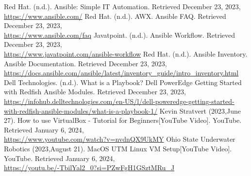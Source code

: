 \documentclass[semifinal]{cpecmu}
\author{นายชลนันต์ ทองไทย}{Chonlanan Thongthai}{640610625}
\author{นายทัตพงศ์ เสริมสุข}{Tadphong Sermsook}{640610636}
\author{นายศุภณัฐ วังทิพย์}{Suphanath Wangtip}{640612098}
\begin{document}


\pagestyle{empty}\cleardoublepage
\normalspacing \setcounter{page}{1}  \pagestyle{cpecmu}





\ifproject

\fi


\begin{thebibliography}{9}
  Red Hat. (n.d.). Ansible: Simple IT Automation. Retrieved December 23, 2023,\\ \url{https://www.ansible.com/}
  Red Hat. (n.d.). AWX. Ansible FAQ. Retrieved December 23, 2023,\\ \url{https://www.ansible.com/faq}
   Javatpoint. (n.d.). Ansible Workflow. Retrieved December 23, 2023, \\ \url{https://www.javatpoint.com/ansible-workflow}
   Red Hat. (n.d.). Ansible Inventory. Ansible Documentation. Retrieved December 23, 2023,\\ \url{https://docs.ansible.com/ansible/latest/inventory_guide/intro_inventory.html}
   Dell Technologies. (n.d.). What is a Playbook? Dell PowerEdge Getting Started with Redfish Ansible Modules. Retrieved December 23, 2023, \\ \url{https://infohub.delltechnologies.com/en-US/l/dell-poweredge-getting-started-with-redfish-ansible-modules/what-is-a-playbook-1/}
  Kevin Stratvert   (2023,June 27). How to use VirtualBox - Tutorial for Beginners[YouTube Video]. YouTube. Retrieved January 6, 2024,\\ \url{https://www.youtube.com/watch?v=nvdnQX9UkMY}
  Ohio State Underwater Robotics (2023,August 21). MacOS UTM Linux VM Setup[YouTube Video]. YouTube. Retrieved January 6, 2024,\\ \url{https://youtu.be/-TbilYal2_0?si=PZwFgH1GSztMRu_J}
\end{thebibliography}


\ifproject
\normalspacing
\appendix


\ifglossary\glossarypage\fi

\ifindex\indexpage\fi

\fi %
\end{document}
